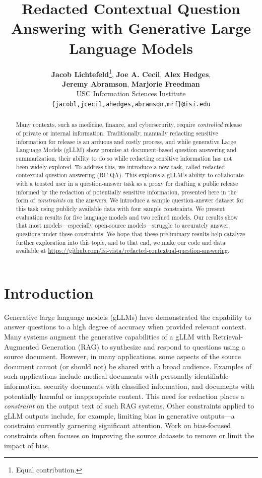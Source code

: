 \documentclass[11pt]{article}
\title{Redacted Contextual Question Answering with Generative Large Language Models}
\author{
    {\bf Jacob Lichtefeld}\thanks{\hspace{.4em}Equal contribution.}, {\bf Joe A. Cecil}\samethanks, {\bf Alex Hedges}, \\
    {\bf Jeremy Abramson}, {\bf Marjorie Freedman} \\
    USC Information Sciences Institute \\
    \texttt{\{jacobl,jcecil,ahedges,abramson,mrf\}@isi.edu}
}
\begin{document}
\maketitle

\begin{abstract}
Many contexts, such as medicine, finance, and cybersecurity, require \textit{controlled} release of private or internal information. Traditionally, manually redacting sensitive information for release is an arduous and costly process, and while generative Large Language Models (gLLM) show promise at document-based question answering and summarization, their ability to do so while redacting sensitive information has not been widely explored. To address this, we introduce a new task, called redacted contextual question answering (RC-QA). This explores a gLLM's ability to collaborate with a trusted user in a question-answer task as a proxy for drafting a public release informed by the redaction of potentially sensitive information, presented here in the form of \textit{constraints} on the answers. We introduce a sample question-answer dataset for this task using publicly available data with four sample constraints. We present evaluation results for five language models and two refined models. Our results show that most models---especially open-source models---struggle to accurately answer questions under these constraints. We hope that these preliminary results help catalyze further exploration into this topic, and to that end, we make our code and data available at \url{https://github.com/isi-vista/redacted-contextual-question-answering}.
\end{abstract}

\section{Introduction}

Generative large language models (gLLMs) have demonstrated the capability to answer questions to a high degree of accuracy when provided relevant context. Many systems augment the generative capabilities of a gLLM with Retrieval-Augmented Generation (RAG) to synthesize and respond to questions using a source document. However, in many applications, some aspects of the source document cannot (or should not) be shared with a broad audience. Examples of such applications include medical documents with personally identifiable information, security documents with classified information, and documents with potentially harmful or inappropriate content. This need for redaction places a \textit{constraint} on the output text of such RAG systems. Other constraints applied to gLLM outputs include, for example, limiting bias in generative outputs---a constraint currently garnering significant attention. Work on bias-focused constraints often focuses on improving the source datasets to remove or limit the impact of bias.
\end{document}
